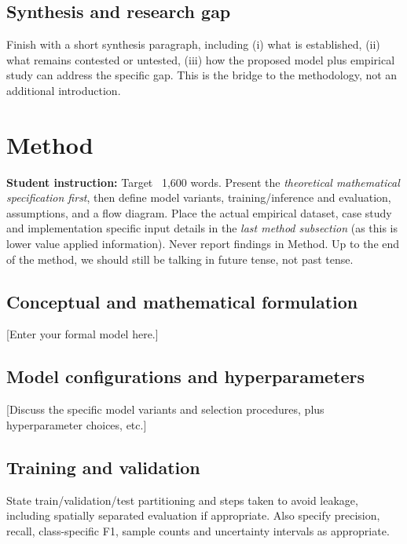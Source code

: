 \documentclass[11pt,letterpaper]{article}
\newcommand{\guide}[1]{\par\begingroup\color{blue!60!black}\small\textbf{Student
instruction:} #1\par\endgroup}
\begin{document}
\subsection{Synthesis and research gap}
Finish with a short synthesis paragraph, including (i) what is established, (ii) what remains contested or
untested, (iii) how the proposed model plus empirical study can address the specific gap.
This is the bridge to the methodology, not an additional introduction.

\section{Method}
\guide{Target ~1,600 words. Present the \emph{theoretical mathematical specification
first}, then define model variants, training/inference and evaluation, assumptions, and a
flow diagram. Place the actual empirical dataset, case study and implementation specific
input details in the \emph{last method subsection} (as this is lower value applied information). 
Never report findings in Method. Up to the end of the method, we should still be talking in future tense, not past tense.}
\subsection{Conceptual and mathematical formulation}
[Enter your formal model here.]
\subsection{Model configurations and hyperparameters}
[Discuss the specific model variants and selection procedures, plus hyperparameter choices, etc.]
\subsection{Training and validation}
State train/validation/test partitioning and steps taken to avoid leakage, including
spatially separated evaluation if appropriate. 
Also specify precision, recall, class-specific F1, sample counts and uncertainty intervals
as appropriate. 
\end{document}
